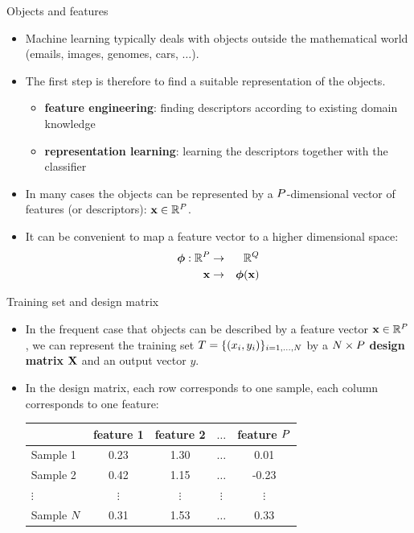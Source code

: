\documentclass[xcolor=pdftex,dvipsnames,table]{beamer}
\begin{document}
\begin{frame}{Objects and features}
\begin{itemize}
\item Machine learning typically deals with objects outside the mathematical world (emails, images, genomes, cars, $\ldots$).
\item The first step is therefore to find a suitable representation of the objects. 
\begin{itemize}
\item \textbf{feature engineering}: finding descriptors according to existing domain knowledge
\item \textbf{representation learning}: learning the descriptors together with the classifier
\end{itemize}
\item In many cases the objects can be represented by a $P$-dimensional vector of features (or descriptors): $\mathbf{x} \in \mathbb{R}^{P}$. 
\item It can be convenient to map a feature vector to a higher dimensional space:
\begin{eqnarray}
\boldsymbol{\phi} : \mathbb{R}^{P} &\rightarrow & \mathbb{R}^Q \\
\mathbf{x} &\rightarrow &\boldsymbol{\phi} (\mathbf{x})
\end{eqnarray}
\end{itemize}
\end{frame}

\begin{frame}{Training set and design matrix}
\begin{itemize}
\item In the frequent case that objects can be described by a feature vector $\mathbf{x} \in \mathbb{R}^{P}$, we can represent the training set $T = \{(x_i, y_i)\}_{i=1, \ldots, N}$ by a $N \times P$ \textbf{design matrix} $\mathbf{X}$ and an output vector $y$.
\item In the design matrix, each row corresponds to one sample, each column corresponds to one feature: 
\begin{table}
\begin{tabular}{|l || c | c | c | c |}
	\hline
		& feature 1 & feature 2 & $\ldots$ & feature $P$ \\
	\hline \hline
	Sample 1 & 0.23 & 1.30 & $\ldots$ & 0.01 \\ 
	\hline
	Sample 2 & 0.42 & 1.15 & $\ldots$ & -0.23 \\ 
	\hline
	$\vdots$ & $\vdots$ & $\vdots$ & $\vdots$ & $\vdots$ \\ 
	\hline
	Sample $N$ & 0.31 & 1.53 & $\ldots$ & 0.33 \\ 
	\hline
\end{tabular}
\end{table}
\end{itemize}
\end{frame}
\end{document}
